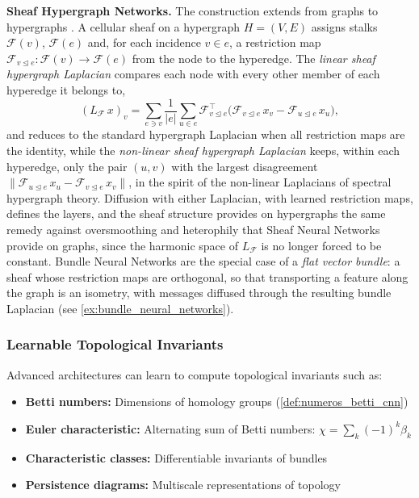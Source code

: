 \textbf{Sheaf Hypergraph Networks.} The construction extends from graphs to hypergraphs \citep{duta2023sheafhypergraph}. A cellular sheaf on a hypergraph $H = (V, E)$ assigns stalks $\mathcal{F}(v)$, $\mathcal{F}(e)$ and, for each incidence $v \in e$, a restriction map $\mathcal{F}_{v \trianglelefteq e}: \mathcal{F}(v) \to \mathcal{F}(e)$ from the node to the hyperedge. The \emph{linear sheaf hypergraph Laplacian} compares each node with every other member of each hyperedge it belongs to,
\[(L_{\mathcal{F}}\, x)_v = \sum_{e \ni v} \frac{1}{|e|} \sum_{u \in e} \mathcal{F}_{v \trianglelefteq e}^{\top}\big(\mathcal{F}_{v \trianglelefteq e}\, x_v - \mathcal{F}_{u \trianglelefteq e}\, x_u\big),\]
and reduces to the standard hypergraph Laplacian when all restriction maps are the identity, while the \emph{non-linear sheaf hypergraph Laplacian} keeps, within each hyperedge, only the pair $(u, v)$ with the largest disagreement $\|\mathcal{F}_{u \trianglelefteq e}\, x_u - \mathcal{F}_{v \trianglelefteq e}\, x_v\|$, in the spirit of the non-linear Laplacians of spectral hypergraph theory. Diffusion with either Laplacian, with learned restriction maps, defines the layers, and the sheaf structure provides on hypergraphs the same remedy against oversmoothing and heterophily that Sheaf Neural Networks provide on graphs, since the harmonic space of $L_{\mathcal{F}}$ is no longer forced to be constant. Bundle Neural Networks \citep{bamberger2024bundlenn} are the special case of a \emph{flat vector bundle}: a sheaf whose restriction maps are orthogonal, so that transporting a feature along the graph is an isometry, with messages diffused through the resulting bundle Laplacian (see \autoref{ex:bundle_neural_networks}).

\subsubsection{Learnable Topological Invariants}

Advanced architectures can learn to compute topological invariants such as:
\begin{itemize}
    \item \textbf{Betti numbers:} Dimensions of homology groups (\autoref{def:numeros_betti_cnn})
    \item \textbf{Euler characteristic:} Alternating sum of Betti numbers: $\chi = \sum_k (-1)^k \beta_k$
    \item \textbf{Characteristic classes:} Differentiable invariants of bundles
    \item \textbf{Persistence diagrams:} Multiscale representations of topology
\end{itemize}

